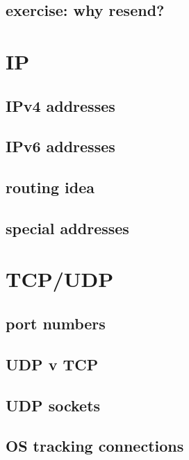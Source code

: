 \subsection{exercise: why resend?}


\section{IP}


\subsection{IPv4 addresses}


\subsection{IPv6 addresses}


\subsection{routing idea}


\subsection{special addresses}


\section{TCP/UDP}

\subsection{port numbers}


\subsection{UDP v TCP}


\subsection{UDP sockets}


\subsection{OS tracking connections}


